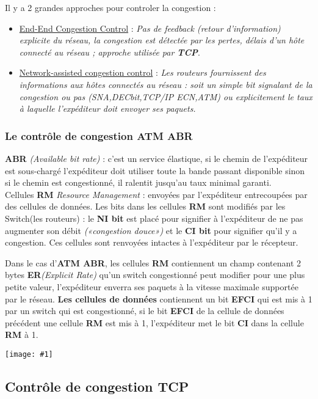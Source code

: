 \documentclass{article}
\newcommand{\ora}[1]{\textcolor{darko}{#1}}
\newcommand{\imgR}[2]{\begin{center}\texttt{[image: \#1]}\end{center}}
\newcommand{\point}[2]{\item \ora{\underline{#1}} : \textit{#2}}
\begin{document}
Il y a 2 grandes approches pour controler la congestion : 
\begin{itemize}
\point{End-End Congestion Control}{Pas de feedback (retour d'information) explicite du réseau, la congestion
est détectée par les pertes, délais d'un hôte connecté au réseau ; approche utilisée par \textbf{TCP}}.
\point{Network-assisted congestion control}{Les routeurs fournissent des informations aux hôtes connectés au
réseau : soit un simple bit signalant de la congestion ou pas (SNA,DECbit,TCP/IP ECN,ATM) ou explicitement le
taux à laquelle l'expéditeur doit envoyer ses paquets.}
\end{itemize}

\subsubsection{Le contrôle de congestion ATM ABR}

\textbf{ABR} \textit{(Available bit rate)} : c'est un service élastique, si le chemin de l'expéditeur est 
sous-chargé l'expéditeur doit utiliser toute la bande passant disponible sinon si le chemin est congestionné, il 
ralentit jusqu'au taux minimal garanti. \\

Cellules \textbf{RM} \textit{Resource Management} : envoyées par l'expéditeur entrecoupées par des cellules de
données. Les bits dans les cellules \textbf{RM} sont modifiés par les Switch(les routeurs) : le \textbf{NI bit} 
est placé pour signifier à l'expéditeur de ne pas augmenter son débit \textit{(«congestion douce»)} et le
\textbf{CI bit} pour signifier qu'il y a congestion. Ces cellules sont renvoyées intactes à l'expéditeur par le
récepteur.

Dans le cas d'\textbf{ATM ABR}, les cellules \textbf{RM} contiennent un champ contenant 2 bytes 
\textbf{ER}\textit{(Explicit Rate)} qu'un switch congestionné peut modifier pour une plus petite valeur, 
l'expéditeur enverra ses paquets à la vitesse maximale supportée par le réseau. \textbf{Les cellules de données} 
contiennent un bit \textbf{EFCI} qui est mis à 1 par un switch qui est congestionné, si le bit \textbf{EFCI} de 
la cellule de données précédent une cellule \textbf{RM} est mis à 1, l'expéditeur met le bit \textbf{CI} dans 
la cellule \textbf{RM} à 1.

\imgR{CN_062.png}{250}

\subsection{Contrôle de congestion TCP}
\end{document}
